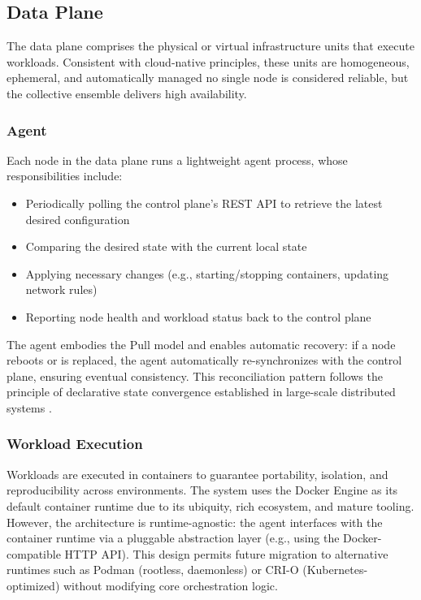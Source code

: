 \subsection{Data Plane}

The data plane comprises the physical or virtual infrastructure units that execute workloads. Consistent with cloud-native principles, these units are homogeneous, ephemeral, and automatically managed  no single node is considered reliable, but the collective ensemble delivers high availability.

\subsubsection{Agent}
Each node in the data plane runs a lightweight agent process, whose responsibilities include:

\begin{itemize}
    \item Periodically polling the control plane’s REST API to retrieve the latest desired configuration
    \item Comparing the desired state with the current local state
    \item Applying necessary changes (e.g., starting/stopping containers, updating network rules)
    \item Reporting node health and workload status back to the control plane
\end{itemize}

The agent embodies the Pull model and enables automatic recovery: if a node reboots or is replaced, the agent automatically re-synchronizes with the control plane, ensuring eventual consistency. This reconciliation pattern follows the principle of declarative state convergence established in large-scale distributed systems \cite{dean2004mapreduce}.

\subsubsection{Workload Execution}
Workloads are executed in containers to guarantee portability, isolation, and reproducibility across environments. The system uses the Docker Engine as its default container runtime due to its ubiquity, rich ecosystem, and mature tooling. However, the architecture is runtime-agnostic: the agent interfaces with the container runtime via a pluggable abstraction layer (e.g., using the Docker-compatible HTTP API). This design permits future migration to alternative runtimes such as Podman (rootless, daemonless) or CRI-O (Kubernetes-optimized) without modifying core orchestration logic.

